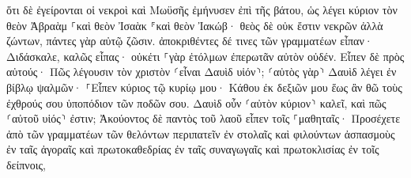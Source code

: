 \documentclass{openreader}
\begin{document}
ὅτι δὲ ἐγείρονται οἱ νεκροὶ καὶ Μωϋσῆς ἐμήνυσεν ἐπὶ τῆς βάτου, ὡς λέγει κύριον τὸν θεὸν Ἀβραὰμ ⸀καὶ θεὸν Ἰσαὰκ ⸁καὶ θεὸν Ἰακώβ· 
θεὸς δὲ οὐκ ἔστιν νεκρῶν ἀλλὰ ζώντων, πάντες γὰρ αὐτῷ ζῶσιν. 
ἀποκριθέντες δέ τινες τῶν γραμματέων εἶπαν· Διδάσκαλε, καλῶς εἶπας· 
οὐκέτι ⸀γὰρ ἐτόλμων ἐπερωτᾶν αὐτὸν οὐδέν. 
Εἶπεν δὲ πρὸς αὐτούς· Πῶς λέγουσιν τὸν χριστὸν ⸂εἶναι Δαυὶδ υἱόν⸃; 
⸂αὐτὸς γὰρ⸃ Δαυὶδ λέγει ἐν βίβλῳ ψαλμῶν· ⸀Εἶπεν κύριος τῷ κυρίῳ μου· Κάθου ἐκ δεξιῶν μου 
ἕως ἂν θῶ τοὺς ἐχθρούς σου ὑποπόδιον τῶν ποδῶν σου. 
Δαυὶδ οὖν ⸂αὐτὸν κύριον⸃ καλεῖ, καὶ πῶς ⸂αὐτοῦ υἱός⸃ ἐστιν; 
Ἀκούοντος δὲ παντὸς τοῦ λαοῦ εἶπεν τοῖς ⸀μαθηταῖς· 
Προσέχετε ἀπὸ τῶν γραμματέων τῶν θελόντων περιπατεῖν ἐν στολαῖς καὶ φιλούντων ἀσπασμοὺς ἐν ταῖς ἀγοραῖς καὶ πρωτοκαθεδρίας ἐν ταῖς συναγωγαῖς καὶ πρωτοκλισίας ἐν τοῖς δείπνοις, 
\end{document}
